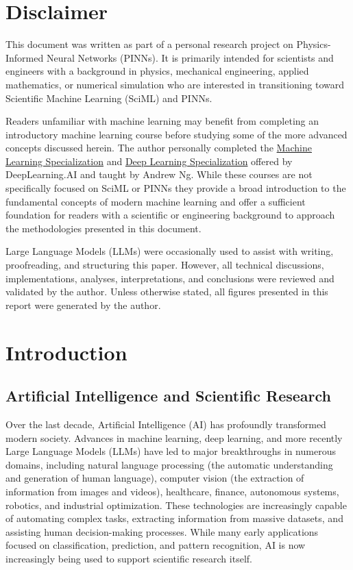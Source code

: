 \section*{Disclaimer}

This document was written as part of a personal research project on Physics-Informed Neural Networks (PINNs). It is primarily intended for scientists and engineers with a background in physics, mechanical engineering, applied mathematics, or numerical simulation who are interested in transitioning toward Scientific Machine Learning (SciML) and PINNs.

Readers unfamiliar with machine learning may benefit from completing an introductory machine learning course before studying some of the more advanced concepts discussed herein. The author personally completed the \href{https://www.coursera.org/specializations/machine-learning-introduction}{Machine Learning Specialization} and \href{https://www.coursera.org/specializations/deep-learning}{Deep Learning Specialization} offered by DeepLearning.AI and taught by Andrew Ng. While these courses are not specifically focused on SciML or PINNs they provide a broad introduction to the fundamental concepts of modern machine learning and offer a sufficient foundation for readers with a scientific or engineering background to approach the methodologies presented in this document.

Large Language Models (LLMs) were occasionally used to assist with writing, proofreading, and structuring this paper. However, all technical discussions, implementations, analyses, interpretations, and conclusions were reviewed and validated by the author. Unless otherwise stated, all figures presented in this report were generated by the author.

\section{Introduction}

\subsection{Artificial Intelligence and Scientific Research}

Over the last decade, Artificial Intelligence (AI) has profoundly transformed modern society. Advances in machine learning, deep learning, and more recently Large Language Models (LLMs) have led to major breakthroughs in numerous domains, including natural language processing (the automatic understanding and generation of human language), computer vision (the extraction of information from images and videos), healthcare, finance, autonomous systems, robotics, and industrial optimization. These technologies are increasingly capable of automating complex tasks, extracting information from massive datasets, and assisting human decision-making processes. While many early applications focused on classification, prediction, and pattern recognition, AI is now increasingly being used to support scientific research itself.

